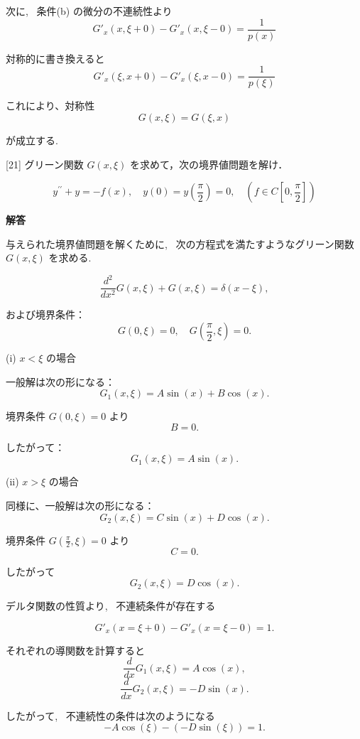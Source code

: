 \documentclass{jsarticle}
\begin{document}
次に, \ 条件(b) の微分の不連続性より
\[
G'_x(x, \xi+0) - G'_x(x, \xi-0) = \frac{1}{p(x)}
\]

対称的に書き換えると
\[
G'_x(\xi, x+0) - G'_x(\xi, x-0) = \frac{1}{p(\xi)}
\]

これにより、対称性
\[
G(x, \xi) = G(\xi, x)
\]

が成立する.



\bigskip
\bigskip

\begin{itembox}[l]{[21]}
グリーン関数 $G(x, \xi)$ を求めて，次の境界値問題を解け．


\begin{equation*}
y^{\prime \prime}+y=-f(x), \quad y(0)=y\left(\frac{\pi}{2}\right)=0, \quad\left(f \in C\left[0, \frac{\pi}{2}\right]\right) \tag{37}
\end{equation*}  
\end{itembox}

\textbf{解答}

与えられた境界値問題を解くために, \ 次の方程式を満たすようなグリーン関数 \( G(x, \xi) \) を求める.


\[
\frac{d^2}{dx^2} G(x, \xi) + G(x, \xi) = \delta(x - \xi),
\]

および境界条件：
\[
G(0, \xi) = 0, \quad G\left(\frac{\pi}{2}, \xi\right) = 0.
\]

(i) \( x < \xi \) の場合

一般解は次の形になる：
\[
G_1(x, \xi) = A \sin(x) + B \cos(x).
\]

境界条件 \( G(0, \xi) = 0 \) より
\[
B = 0.
\]

したがって：
\[
G_1(x, \xi) = A \sin(x).
\]

(ii) \( x > \xi \) の場合

同様に、一般解は次の形になる：
\[
G_2(x, \xi) = C \sin(x) + D \cos(x).
\]

境界条件 \( G\left(\frac{\pi}{2}, \xi\right) = 0 \) より
\[
C = 0.
\]

したがって
\[
G_2(x, \xi) = D \cos(x).
\]


デルタ関数の性質より, \ 不連続条件が存在する

\[
G'_x(x=\xi+0) - G'_x(x=\xi-0) = 1.
\]

それぞれの導関数を計算すると
\[
\frac{d}{dx} G_1(x, \xi) = A \cos(x),
\]
\[
\frac{d}{dx} G_2(x, \xi) = -D \sin(x).
\]

したがって, \ 不連続性の条件は次のようになる
\[
-A \cos(\xi) - (-D \sin(\xi)) = 1.
\]
\end{document}
